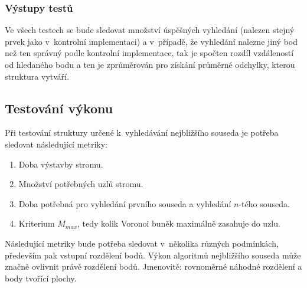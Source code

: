 \subsubsection*{Výstupy testů}
Ve všech testech se bude sledovat množství úspěšných vyhledání (nalezen stejný prvek jako v~kontrolní implementaci) a v~případě, že vyhledání nalezne jiný bod než ten správný podle kontrolní implementace, tak je spočten rozdíl vzdáleností od hledaného bodu a ten je zprůměrován pro získání průměrné odchylky, kterou struktura vytváří.



\subsection*{Testování výkonu}
Při testování struktury určené k~vyhledávání nejbližšího souseda je potřeba sledovat následující metriky:
\begin{enumerate}
    \item Doba výstavby stromu.
    \item Množství potřebných uzlů stromu.
    \item Doba potřebná pro vyhledání prvního souseda a vyhledání $n$-tého souseda.
    \item Kriterium $M_{max}$, tedy kolik Voronoi buněk maximálně zasahuje do uzlu.
\end{enumerate}

Následující metriky bude potřeba sledovat v~několika různých podmínkách, především pak vstupní rozdělení bodů. Výkon algoritmů nejbližšího souseda může značně ovlivnit právě rozdělení bodů. Jmenovitě: rovnoměrné náhodné rozdělení a body tvořící plochy.


